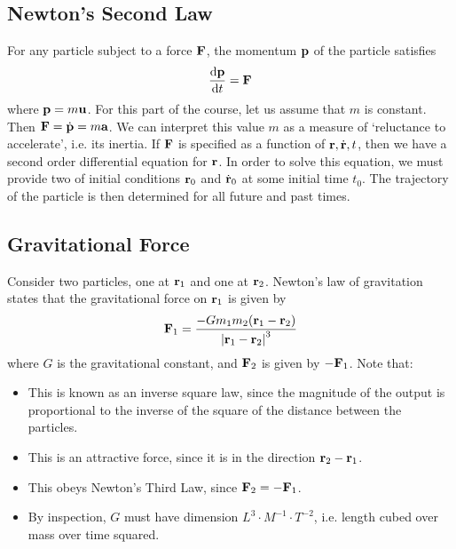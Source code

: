 \subsection{Newton's Second Law}
For any particle subject to a force \(\vb F\), the momentum \(\vb p\) of the particle satisfies
\[ \frac{\dd \vb p}{\dd{t}} = \vb F \]
where \(\vb p = m \vb u\). For this part of the course, let us assume that \(m\) is constant. Then \(\vb F = \dot{\vb p} = m \vb a\). We can interpret this value \(m\) as a measure of `reluctance to accelerate', i.e. its inertia. If \(\vb F\) is specified as a function of \(\vb r, \dot{\vb r}, t\), then we have a second order differential equation for \(\vb r\). In order to solve this equation, we must provide two of initial conditions \(\vb r_0\) and \(\dot{\vb r}_0\) at some initial time \(t_0\). The trajectory of the particle is then determined for all future and past times.

\subsection{Gravitational Force}
Consider two particles, one at \(\vb r_1\) and one at \(\vb r_2\). Newton's law of gravitation states that the gravitational force on \(\vb r_1\) is given by
\[ \vb F_1 = \frac{- G m_1 m_2 (\vb r_1 - \vb r_2)}{\abs{\vb r_1 - \vb r_2}^3} \]
where \(G\) is the gravitational constant, and \(\vb F_2\) is given by \(-\vb F_1\). Note that:
\begin{itemize}
	\item This is known as an inverse square law, since the magnitude of the output is proportional to the inverse of the square of the distance between the particles.
	\item This is an attractive force, since it is in the direction \(\vb r_2 - \vb r_1\).
	\item This obeys Newton's Third Law, since \(\vb F_2 = - \vb F_1\).
	\item By inspection, \(G\) must have dimension \(L^3 \cdot M^{-1} \cdot T^{-2}\), i.e. length cubed over mass over time squared.
\end{itemize}

